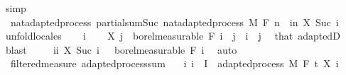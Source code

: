 \begin{isabellebody}
\ simp\isanewline
{}\isamarkupfalse%
%
\endisatagproof
{\isafoldproof}%
%
\isadelimproof
\isanewline
%
\endisadelimproof
\isanewline
{}\isamarkupfalse%
\isanewline
\isanewline
{}\isamarkupfalse%
\ {\isacharparenleft}{\kern0pt}\ nat{\isacharunderscore}{\kern0pt}adapted{\isacharunderscore}{\kern0pt}process{\isacharparenright}{\kern0pt}\ partial{\isacharunderscore}{\kern0pt}sum{\isacharunderscore}{\kern0pt}Suc{\isacharcolon}{\kern0pt}\ {\isachardoublequoteopen}nat{\isacharunderscore}{\kern0pt}adapted{\isacharunderscore}{\kern0pt}process\ M\ F\ {\isacharparenleft}{\kern0pt}{\isasymlambda}n\ {\isasymxi}{\isachardot}{\kern0pt}\ {\isasymSum}i{\isacharless}{\kern0pt}n{\isachardot}{\kern0pt}\ X\ {\isacharparenleft}{\kern0pt}Suc\ i{\isacharparenright}{\kern0pt}\ {\isasymxi}{\isacharparenright}{\kern0pt}{\isachardoublequoteclose}\ \isanewline
%
\isadelimproof
%
\endisadelimproof
%
\isatagproof
{}\isamarkupfalse%
\ {\isacharparenleft}{\kern0pt}unfold{\isacharunderscore}{\kern0pt}locales{\isacharparenright}{\kern0pt}\isanewline
\ \ \isamarkupfalse%
\ i\isanewline
\ \ \isamarkupfalse%
\ {\isachardoublequoteopen}X\ j\ {\isasymin}\ borel{\isacharunderscore}{\kern0pt}measurable\ {\isacharparenleft}{\kern0pt}F\ i{\isacharparenright}{\kern0pt}{\isachardoublequoteclose}\ \ {\isachardoublequoteopen}j\ {\isasymle}\ i{\isachardoublequoteclose}\ \ j\ \isamarkupfalse%
\ that\ adaptedD\ \isamarkupfalse%
\ blast\isanewline
\ \ \isamarkupfalse%
\ {\isachardoublequoteopen}{\isacharparenleft}{\kern0pt}{\isasymlambda}{\isasymxi}{\isachardot}{\kern0pt}\ {\isasymSum}i{\isacharless}{\kern0pt}i{\isachardot}{\kern0pt}\ X\ {\isacharparenleft}{\kern0pt}Suc\ i{\isacharparenright}{\kern0pt}\ {\isasymxi}{\isacharparenright}{\kern0pt}\ {\isasymin}\ borel{\isacharunderscore}{\kern0pt}measurable\ {\isacharparenleft}{\kern0pt}F\ i{\isacharparenright}{\kern0pt}{\isachardoublequoteclose}\ \isamarkupfalse%
\ auto\isanewline
{}\isamarkupfalse%
%
\endisatagproof
{\isafoldproof}%
%
\isadelimproof
\isanewline
%
\endisadelimproof
\isanewline
{}\isamarkupfalse%
\ {\isacharparenleft}{\kern0pt}\ filtered{\isacharunderscore}{\kern0pt}measure{\isacharparenright}{\kern0pt}\ adapted{\isacharunderscore}{\kern0pt}process{\isacharunderscore}{\kern0pt}sum{\isacharcolon}{\kern0pt}\isanewline
\ \ \ {\isachardoublequoteopen}{\isasymAnd}i{\isachardot}{\kern0pt}\ i\ {\isasymin}\ I\ {\isasymLongrightarrow}\ adapted{\isacharunderscore}{\kern0pt}process\ M\ F\ t\ {\isacharparenleft}{\kern0pt}X\ i{\isacharparenright}{\kern0pt}{\isachardoublequoteclose}\isanewline

\end{isabellebody}
